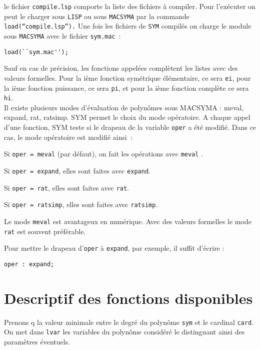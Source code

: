 \documentclass[11pt]{article}
\begin{document}
le fichier {\tt compile.lsp} comporte la liste des fichiers \`a
compiler. Pour l'ex\'ecuter on peut le charger sous {\tt LISP} ou sous
{\tt MACSYMA}
par la commande {\tt load(``compile.lsp'').} 
Une fois les fichiers de {\tt SYM} compil\'es on charge le module sous
{\tt MACSYMA} avec le fichier {\tt sym.mac}~: 
\begin{verbatim}
load(``sym.mac'');
\end{verbatim}

Sauf en cas de pr\'{e}cision, les fonctions appel\'{e}es compl\`{e}tent les
listes avec des valeurs formelles.
Pour la i\`{e}me fonction sym\'{e}trique \'{e}l\'{e}mentaire, ce sera {\tt ei},
pour la i\`{e}me fonction puissance, ce sera {\tt pi}, et pour la i\`{e}me 
fonction compl\`ete  ce sera {\tt hi}.\\

Il existe plusieurs modes d'\'evaluation de polyn\^omes sous MACSYMA :
meval, expand, rat, ratsimp.
SYM permet le choix du mode op\'eratoire.
A chaque appel d'une fonction, SYM teste si le drapeau de la variable {\tt oper}
a \'et\'e modifi\'e. Dans ce cas, le mode op\'eratoire est modifi\'e ainsi~:
\begin{description}
\item Si {\tt oper = meval} (par d\'efaut), on fait
      les op\'erations avec {\tt meval} .
\item Si {\tt oper = expand}, elles sont faites avec {\tt expand}.
      
\item Si {\tt oper = rat}, elles sont faites avec {\tt rat}.
\item Si {\tt oper = ratsimp}, elles sont faites avec {\tt ratsimp}.

\end{description}
Le mode {\tt meval} est avantageux en num\'erique. Avec des valeurs
formelles le mode {\tt rat} est souvent pr\'ef\'erable.

Pour mettre le drapeau d'{\tt oper} \`a {\tt expand}, par exemple, il
suffit d'\'ecrire :
\begin{center}
{\tt oper : expand;}
\end{center}
\section{Descriptif des fonctions disponibles}

Prenons q la valeur minimale entre le degr\'{e} du polyn\^ome {\tt sym}
 et le cardinal {\tt card}.
On met dans {\tt lvar} les variables du polyn\^ome consid\'er\'e le
distinguant ainsi des param\`etres \'eventuels.
\end{document}
